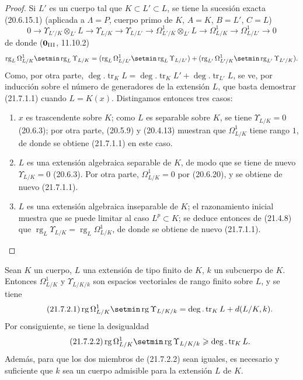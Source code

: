 \begin{proof}
Si $L'$ es un cuerpo tal que $K\subset L'\subset L$, se tiene la sucesión exacta
(20.6.15.1) (aplicada a $\Lambda=P$, cuerpo primo de $K$, $A=K$,
$B=L'$, $C=L$)
\[
0\to\Upsilon_{L'/K}\otimes_{L'}L\to\Upsilon_{L/K}\to\Upsilon_{L/L'}
\to\Omega^1_{L'/K}\otimes_{L'}L\to\Omega^1_{L/K}
\to\Omega^1_{L/L'}\to0
\]
de donde ($\mathbf{0}_{\rm III}$, 11.10.2)
\[
\operatorname{rg}_L\Omega^1_{L/K}\setmin\operatorname{rg}_L\Upsilon_{L/K}
=(\operatorname{rg}_L\Omega^1_{L/L'}\setmin\operatorname{rg}_L\Upsilon_{L/L'})
+(\operatorname{rg}_{L'}\Omega^1_{L'/K}\setmin\operatorname{rg}_{L'}\Upsilon_{L'/K}).
\]
Como, por otra parte, $\deg.\operatorname{tr}_K L=\deg.\operatorname{tr}_K L'
+\deg.\operatorname{tr}_{L'}L$, se ve, por inducción sobre el número de
generadores de la extensión $L$, que basta demostrar (21.7.1.1) cuando
$L=K(x)$. Distingamos entonces tres casos:
\begin{enumerate}
  \item[\textit{a)}] $x$ es trascendente sobre $K$; como $L$ es separable sobre
  $K$, se tiene $\Upsilon_{L/K}=0$ (20.6.3); por otra parte, (20.5.9) y
  (20.4.13) muestran que $\Omega^1_{L/K}$ tiene rango $1$, de donde se
  obtiene (21.7.1.1) en este caso.
  \item[\textit{b)}] $L$ es una extensión algebraica separable de $K$, de modo que
  se tiene de nuevo $\Upsilon_{L/K}=0$ (20.6.3). Por otra parte,
  $\Omega^1_{L/K}=0$ por (20.6.20), y se obtiene de nuevo (21.7.1.1).
  \item[\textit{c)}] $L$ es una extensión algebraica inseparable de $K$; el
  razonamiento inicial muestra que se puede limitar al caso $L^p\subset K$;
  se deduce entonces de (21.4.8) que
  $\operatorname{rg}_L\Upsilon_{L/K}=\operatorname{rg}_L\Omega^1_{L/K}$,
  de donde se obtiene de nuevo (21.7.1.1).
\end{enumerate}
\end{proof}

\begin{corollary}[21.7.2]
\label{0.21.7.2-fr}
Sean $K$ un cuerpo, $L$ una extensión de tipo finito de $K$, $k$ un subcuerpo
de $K$. Entonces $\Omega^1_{L/K}$ y $\Upsilon_{L/K/k}$ son espacios
vectoriales de rango finito sobre $L$, y se tiene
\begin{equation}
\tag{21.7.2.1}
\label{0.21.7.2.1-fr}
\operatorname{rg}\Omega^1_{L/K}\setmin\operatorname{rg}\Upsilon_{L/K/k}
=\deg.\operatorname{tr}_K L+d(L/K,k).
\end{equation}
Por consiguiente, se tiene la desigualdad
\begin{equation}
\tag{21.7.2.2}
\label{0.21.7.2.2-fr}
\operatorname{rg}\Omega^1_{L/K}\setmin\operatorname{rg}\Upsilon_{L/K/k}
\geqslant\deg.\operatorname{tr}_K L.
\end{equation}
Además, para que los dos miembros de \textup{(21.7.2.2)} sean iguales, es necesario y
suficiente que $k$ sea un cuerpo admisible para la extensión $L$ de $K$.
\end{corollary}


